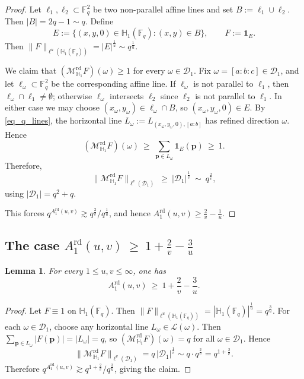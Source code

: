 \documentclass[11pt]{article}
\newtheorem{lemma}[theorem]{Lemma}
\newcommand{\cL}{\mathcal{L}}
\newcommand{\1}{\mathbf 1}
\begin{document}
\begin{proof}
Let $\ell_1,\ell_2\subset\mathbb F_q^2$ be two non-parallel affine lines and set
$B:=\ell_1\cup \ell_2$. Then $|B|=2q-1\sim q$.
Define
\[
E:=\{(x,y,0)\in\mathbb H_1(\mathbb F_q): (x,y)\in B\},
\qquad
F:=\mathbf 1_E.
\]
Then $\|F\|_{\ell^u(\mathbb H_1(\mathbb F_q))}=|E|^{\frac{1}{u}}\sim q^{\frac{1}{u}}$.

We claim that $(\mathcal M^{\mathrm{rd}}_{\mathbb H_1}F)(\omega)\ge 1$ for every $\omega\in\mathcal D_1$.
Fix $\omega=[a:b:c]\in\mathcal D_1$, and let $\ell_\omega\subset\mathbb F_q^2$ be the corresponding affine line.
If $\ell_\omega$ is not parallel to $\ell_1$, then $\ell_\omega\cap \ell_1\neq\emptyset$; otherwise $\ell_\omega$ intersects $\ell_2$ since $\ell_2$ is not parallel to $\ell_1$.
In either case we may choose $(x_\omega,y_\omega)\in \ell_\omega\cap B$, so $(x_\omega,y_\omega,0)\in E$.
By \eqref{eq_q_lines}, the horizontal line $L_\omega:= L_{(x_\omega,y_\omega,0),[a:b]}$ has refined direction $\omega$. 
Hence
\[
(\mathcal M^{\mathrm{rd}}_{\mathbb H_1}F)(\omega)\ \ge\ \sum_{\mathbf p\in L_\omega}\mathbf 1_E(\mathbf p)\ \ge\ 1.
\]
Therefore,
\[
\|\mathcal M^{\mathrm{rd}}_{\mathbb H_1}F\|_{\ell^v(\mathcal D_1)}
\ \ge\ |\mathcal D_1|^{\frac{1}{v}}\ \sim\ q^{\frac{2}{v}},
\]
using $|\mathcal D_1|=q^2+q$.



This forces $q^{A^{\mathrm{rd}}_1(u,v)}\gtrsim q^{\frac{2}{v}}/q^{\frac{1}{u}}$, and hence
$A^{\mathrm{rd}}_1(u,v)\ge \frac{2}{v}-\frac{1}{u}$.
\end{proof}




\subsection{The case $A^{\mathrm{rd}}_1(u,v)\ \ge\ 1+\frac{2}{v}-\frac{3}{u}$}
\begin{lemma}\label{lem:rd-lb-constant}
For every $1\le u,v\le\infty$, one has
\[
A^{\mathrm{rd}}_1(u,v)\ \ge\ 1+\frac{2}{v}-\frac{3}{u}.
\]
\end{lemma}

\begin{proof}
Let $F\equiv 1$ on $\mathbb H_1(\mathbb F_q)$. Then
$\|F\|_{\ell^u(\mathbb H_1(\mathbb F_q))}=|\mathbb H_1(\mathbb F_q)|^{\frac{1}{u}}=q^{\frac{3}{u}}$.
For each $\omega\in\mathcal D_1$, choose any horizontal line $L_\omega\in \cL(\omega)$.
Then $\sum\limits_{\mathbf p\in L_\omega}|F(\mathbf p)|=|L_\omega|=q$, so
$(\mathcal M^{\mathrm{rd}}_{\mathbb H_1}F)(\omega)=q$ for all $\omega\in\mathcal D_1$.
Hence
\[
\|\mathcal M^{\mathrm{rd}}_{\mathbb H_1}F\|_{\ell^v(\mathcal D_1)}
=
q\,|\mathcal D_1|^{\frac{1}{v}}
\sim
q\cdot q^{\frac{2}{v}}
=
q^{1+\frac{2}{v}}.
\]
Therefore $q^{A^{\mathrm{rd}}_1(u,v)}\gtrsim q^{1+\frac{2}{v}}/q^{\frac{3}{u}}$, giving the claim.

\end{proof}
\end{document}
